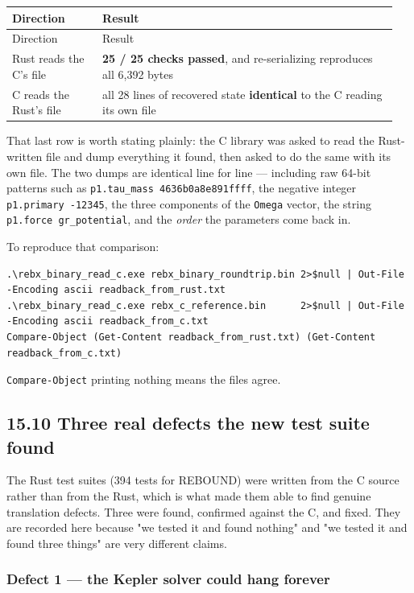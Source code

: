 \documentclass[11pt]{article}
\begin{document}
\begin{longtable}{L{0.223\linewidth}L{0.727\linewidth}}
\toprule
Direction & Result \\
\midrule
\endfirsthead
\toprule
Direction & Result \\
\midrule
\endhead
Rust reads the C's file & \textbf{25 / 25 checks passed}, and re-serializing reproduces all 6,392 bytes \\
C reads the Rust's file & all 28 lines of recovered state \textbf{identical} to the C reading its own file \\
\bottomrule
\end{longtable}

That last row is worth stating plainly: the C library was asked to read the Rust-written file and dump everything it found, then asked to do the same with its own file. The two dumps are identical line for line --- including raw 64-bit patterns such as \texttt{p1.tau\_mass 4636b0a8e891ffff}, the negative integer \texttt{p1.primary -12345}, the three components of the \texttt{Omega} vector, the string \texttt{p1.force gr\_potential}, and the \emph{order} the parameters come back in.

To reproduce that comparison:

\begin{lstlisting}
.\rebx_binary_read_c.exe rebx_binary_roundtrip.bin 2>$null | Out-File -Encoding ascii readback_from_rust.txt
.\rebx_binary_read_c.exe rebx_c_reference.bin      2>$null | Out-File -Encoding ascii readback_from_c.txt
Compare-Object (Get-Content readback_from_rust.txt) (Get-Content readback_from_c.txt)
\end{lstlisting}

\texttt{Compare-Object} printing nothing means the files agree.

\subsection{15.10 Three real defects the new test suite found}

The Rust test suites (394 tests for REBOUND) were written from the C source rather than from the Rust, which is what made them able to find genuine translation defects. Three were found, confirmed against the C, and fixed. They are recorded here because "we tested it and found nothing" and "we tested it and found three things" are very different claims.

\subsubsection{Defect 1 --- the Kepler solver could hang forever}
\end{document}
